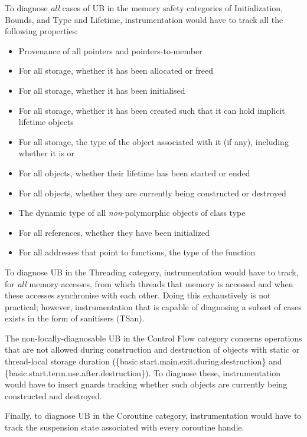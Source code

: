 {To diagnose \emph{all} cases of UB in the memory safety categories of Initialization, Bounds, and Type and Lifetime, instrumentation would have to track all the following properties:

\begin{itemize}
\item Provenance of all pointers and pointers-to-member
\item For all storage, whether it has been allocated or freed
\item For all storage, whether it has been initialised
\item For all storage, whether it has been created such that it can hold implicit lifetime objects
\item For all storage, the type of the object associated with it (if any), including whether it is  or 
\item For all objects, whether their lifetime has been started or ended
\item For all objects, whether they are currently being constructed or destroyed
\item The dynamic type of all \emph{non}-polymorphic objects of class type
\item For all references, whether they have been initialized
\item For all addresses that point to  functions, the type of the function
\end{itemize}

To diagnose UB in the Threading category, instrumentation would have to track, for \emph{all} memory accesses, from which threads that memory is accessed and when these accesses synchronise with each other. Doing this exhaustively is not practical; however, instrumentation that is capable of diagnosing a subset of cases exists in the form of sanitisers (TSan).

The non-locally-diagnosable UB in the Control Flow category concerns operations that are not allowed during construction and destruction of objects with static or thread-local storage duration (\{basic.start.main.exit.during.destruction\} and \{basic.start.term.use.after.destruction\}). To diagnose these, instrumentation would have to insert guards tracking whether such objects are currently being constructed and destroyed.  

Finally, to diagnose UB in the Coroutine category, instrumentation would have to track the suspension state associated with every coroutine handle.

}
